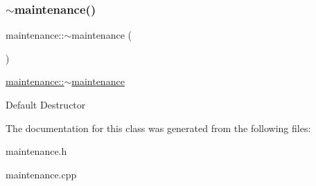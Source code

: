 \subsubsection{\texorpdfstring{$\sim$maintenance()}{~maintenance()}}
{\footnotesize\ttfamily maintenance\+::$\sim$maintenance (\begin{DoxyParamCaption}{ }\end{DoxyParamCaption})}



\mbox{\hyperlink{classmaintenance_a7d52b97e64d46d02e3365014d93e3148}{maintenance\+::$\sim$maintenance}} 

Default Destructor 

The documentation for this class was generated from the following files\+:\begin{DoxyCompactItemize}
\item 
maintenance.\+h\item 
maintenance.\+cpp\end{DoxyCompactItemize}
